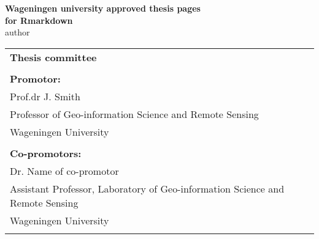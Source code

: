 \thispagestyle{empty}
\begin{center}
\Huge{\textbf{Wageningen university approved thesis pages}} \\
\Huge{\textbf{for Rmarkdown}} \\
\vspace*{1cm}
\vspace*{1cm}
\vspace*{\fill}
\large{author} \\
\end{center}

\newpage
\thispagestyle{empty}
\vspace*{\fill}
\begin{tabular}{l}
    \textbf{Thesis committee}                                                                 \\  
                                                                                              \\  
    \textbf{Promotor:}                                                                        \\  
    Prof.dr J. Smith                                                                          \\  
    Professor of Geo-information Science and Remote Sensing                                   \\  
    Wageningen University                                                                     \\  
                                                                                              \\  
    \textbf{Co-promotors:}                                                                    \\  
    Dr. Name of co-promotor                                                                   \\  
    Assistant Professor, Laboratory of Geo-information Science and Remote Sensing             \\  
    Wageningen University                                                                     \\  
                                                                                              \\  


\end{tabular}
